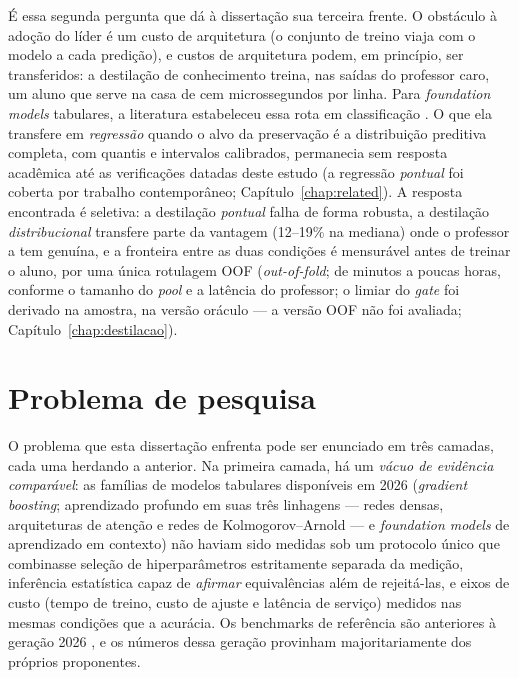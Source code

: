 É essa segunda pergunta que dá à dissertação sua terceira frente. O
obstáculo à adoção do líder é um custo de arquitetura (o conjunto de
treino viaja com o modelo a cada predição), e custos de arquitetura
podem, em princípio, ser transferidos: a destilação de conhecimento
\citep{hinton2015} treina, nas saídas do professor caro, um aluno que
serve na casa de cem microssegundos por linha. Para \emph{foundation models} tabulares, a literatura
estabeleceu essa rota em classificação \citep{pocketfm2026}. O que ela
transfere em \emph{regressão} quando o alvo da
preservação é a distribuição preditiva completa, com
quantis e intervalos calibrados, permanecia sem resposta acadêmica até
as verificações datadas deste estudo (a regressão \emph{pontual} foi
coberta por trabalho contemporâneo; Capítulo~\ref{chap:related}). A resposta encontrada é
seletiva: a destilação \emph{pontual} falha de
forma robusta, a destilação \emph{distribucional} transfere parte
da vantagem (12--19\% na mediana) onde o
professor a tem genuína, e a fronteira entre as duas condições
é mensurável antes de treinar o aluno, por uma única rotulagem OOF
(\emph{out-of-fold}; de minutos a poucas horas, conforme o tamanho
do \emph{pool} e a
latência do professor; o limiar do \emph{gate} foi derivado na
amostra, na versão oráculo --- a versão OOF não foi avaliada;
Capítulo~\ref{chap:destilacao}).

\section{Problema de pesquisa}
\label{sec:intro-problema}

O problema que esta dissertação enfrenta pode ser enunciado em três
camadas, cada uma herdando a anterior. Na primeira camada, há um
\emph{vácuo de evidência comparável}: as famílias de modelos tabulares
disponíveis em 2026 (\emph{gradient boosting}; aprendizado profundo
em suas três linhagens --- redes densas, arquiteturas de atenção e
redes de Kolmogorov--Arnold --- e \emph{foundation models} de
aprendizado em contexto) não haviam sido medidas sob um protocolo único que combinasse
seleção de hiperparâmetros estritamente separada da
medição, inferência estatística capaz de \emph{afirmar} equivalências
além de rejeitá-las, e eixos de custo (tempo de treino, custo de ajuste
e latência de serviço) medidos nas mesmas condições que a acurácia. Os
benchmarks de referência são anteriores à geração 2026
\citep{grinsztajn2022,mcelfresh2023}, e os números dessa geração provinham
majoritariamente dos próprios proponentes.

